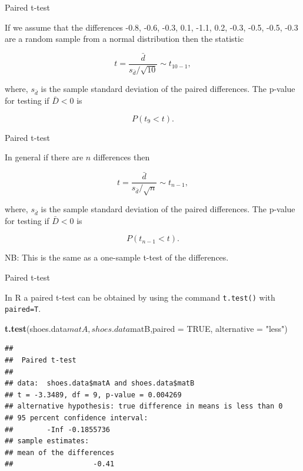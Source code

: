 \documentclass[9pt,ignorenonframetext,]{beamer}
\newenvironment{Shaded}{\begin{snugshade}}{\end{snugshade}}
\newcommand{\KeywordTok}[1]{\textcolor[rgb]{0.13,0.29,0.53}{\textbf{{#1}}}}
\newcommand{\DataTypeTok}[1]{\textcolor[rgb]{0.13,0.29,0.53}{{#1}}}
\newcommand{\StringTok}[1]{\textcolor[rgb]{0.31,0.60,0.02}{{#1}}}
\newcommand{\OtherTok}[1]{\textcolor[rgb]{0.56,0.35,0.01}{{#1}}}
\newcommand{\NormalTok}[1]{{#1}}
\begin{document}
\begin{frame}{Paired t-test}

If we assume that the differences -0.8, -0.6, -0.3, 0.1, -1.1, 0.2,
-0.3, -0.5, -0.5, -0.3 are a random sample from a normal distribution
then the statistic

\[t=\frac{{\bar d}}{s_{\bar d}/\sqrt{10}} \sim t_{10-1},\]

where, \(s_{\bar d}\) is the sample standard deviation of the paired
differences. The p-value for testing if \({\bar D} < 0\) is

\[ P(t_{9}< t).\]

\end{frame}

\begin{frame}{Paired t-test}

In general if there are \(n\) differences then

\[t=\frac{{\bar d}}{s_{\bar d}/\sqrt{n}} \sim t_{n-1},\]

where, \(s_{\bar d}\) is the sample standard deviation of the paired
differences. The p-value for testing if \({\bar D} < 0\) is

\[ P(t_{n-1}< t).\]

NB: This is the same as a one-sample t-test of the differences.

\end{frame}

\begin{frame}[fragile]{Paired t-test}

In R a paired t-test can be obtained by using the command
\texttt{t.test()} with \texttt{paired=T}.

\begin{Shaded}
\begin{Highlighting}[]
\KeywordTok{t.test}\NormalTok{(shoes.data$matA,shoes.data$matB,}\DataTypeTok{paired =} \OtherTok{TRUE}\NormalTok{,}
       \DataTypeTok{alternative =} \StringTok{"less"}\NormalTok{)}
\end{Highlighting}
\end{Shaded}

\begin{verbatim}
## 
##  Paired t-test
## 
## data:  shoes.data$matA and shoes.data$matB
## t = -3.3489, df = 9, p-value = 0.004269
## alternative hypothesis: true difference in means is less than 0
## 95 percent confidence interval:
##        -Inf -0.1855736
## sample estimates:
## mean of the differences 
##                   -0.41
\end{verbatim}

\end{frame}
\end{document}

